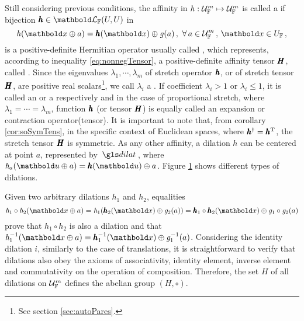 Still considering previous conditions, the affinity in $\map{\mathit{h}}{\eamd{U}{F}{m}}{\eamd{U}{F}{m}}$ is called a  if bijection $\vtf{h}\in\evl{\cam{F}}{U}{U}$ in
\begin{equation}\label{eq:dilat}
\fua{\mathit{h}}{\vto{x}\oplus a}=\fua{\vtf{h}}{\vto{x}}\oplus\fua{\mathit{g}}{a}\,,\,\,\forall\,a\in\eamd{U}{F}{m}\,,\,\vto{x}\in U_\cam{F}\,,
\end{equation}
is a positive-definite Hermitian operator usually called , which represents, according to inequality \eqref{eq:nonnegTensor}, a positive-definite affinity tensor $\tnr{H}$, called . Since the eigenvalues $\lambda_1,\cdots,\lambda_m$ of stretch operator $\vtf{h}$, or of stretch tensor $\tnr{H}$, are positive real scalars\footnote{See section \ref{sec:autoPares}.}, we call $\lambda_i$ a . If coefficient $\lambda_i>1$ or $\lambda_i\leqslant1$, it is called an  or a  respectively and in the case of proportional stretch, where $\lambda_1=\cdots=\lambda_m$, function $\vtf{h}$ (or tensor $\tnr{H}$) is equally called an expansion or contraction operator(tensor). It is important to note that, from corollary \ref{cor:soSymTens}, in the specific context of Euclidean spaces, where $\vtf{h}^\dagger=\vtf{h}^\text{T}$, the stretch tensor $\tnr{H}$ is symmetric. As any other affinity, a dilation $\mathit{h}$ can be centered at point $a$, represented by $\gloref{dilat}$, where $\fua{\mathit{h}_a}{\vto{u}\oplus a}=\fua{\vtf{h}}{\vto{u}}\oplus a$. Figure \ref{fg:dilation} shows different types of dilations.
\begin{figure}[!ht]
\centering
\begin{center}
\scalebox{.72}{}
\end{center}
\label{fg:dilation}
\end{figure}
Given two arbitrary dilations $\mathit{h}_1$ and $\mathit{h}_2$, equalities
\begin{equation*}
\fua{\mathit{h}_1\circ\mathit{h}_2}{\vto{x}\oplus a}=\fua{\mathit{h}_1}{\fua{\vtf{h}_2}{\vto{x}}\oplus\fua{\mathit{g}_2}{a}}=\fua{\vtf{h}_1\circ\vtf{h}_2}{\vto{x}}\oplus\fua{\mathit{g}_1\circ\mathit{g}_2}{a}
\end{equation*}
prove that $\mathit{h}_1\circ\mathit{h}_2$ is also a dilation and that $\fua{\mathit{h}^{-1}_1}{\vto{x}\oplus a}=\fua{\vtf{h}^{-1}_1}{\vto{x}}\oplus\fua{\mathit{g}^{-1}_1}{a}$. Considering the identity dilation $\mathit{i}$, similarly to the case of translations, it is straightforward to verify that dilations also obey the axioms of associativity, identity element, inverse element and commutativity on the operation of composition. Therefore, the set $H$ of all dilations on $\eamd{U}{F}{m}$ defines the abelian group $(H,\circ)$.

